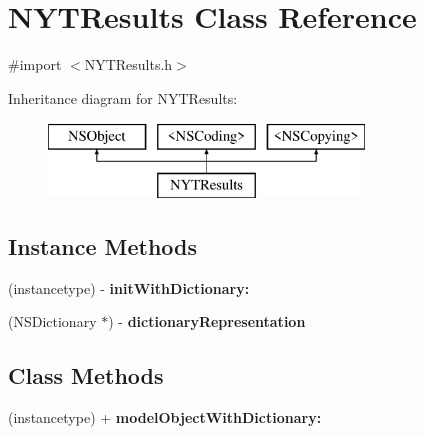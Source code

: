 \section{N\+Y\+T\+Results Class Reference}
\label{interface_n_y_t_results}


{\ttfamily \#import $<$N\+Y\+T\+Results.\+h$>$}

Inheritance diagram for N\+Y\+T\+Results\+:\begin{figure}[H]
\begin{center}
\leavevmode
\includegraphics[height=2.000000cm]{interface_n_y_t_results}
\end{center}
\end{figure}
\subsection*{Instance Methods}
\begin{DoxyCompactItemize}
\item 
(instancetype) -\/ {\bfseries init\+With\+Dictionary\+:}\label{interface_n_y_t_results_a06ba71b8e7f7276b3b4c5d1d4f2c850a}

\item 
(N\+S\+Dictionary $\ast$) -\/ {\bfseries dictionary\+Representation}\label{interface_n_y_t_results_a9a97f069014c37be8bd13b69a8b2855f}

\end{DoxyCompactItemize}
\subsection*{Class Methods}
\begin{DoxyCompactItemize}
\item 
(instancetype) + {\bfseries model\+Object\+With\+Dictionary\+:}\label{interface_n_y_t_results_af691cccf0d9be448de78965194f6c9c4}

\end{DoxyCompactItemize}

